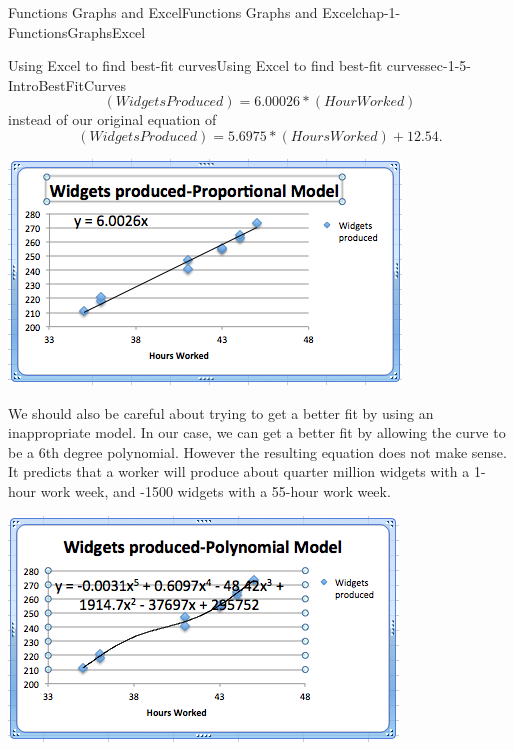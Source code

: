 \documentclass[oneside,10pt,]{book}
\numberwithin{equation}{section}
\begin{document}
\begin{chapterptx}{Functions Graphs and Excel}{}{Functions Graphs and Excel}{}{}{chap-1-FunctionsGraphsExcel}
\begin{sectionptx}{Using Excel to find best-fit curves}{}{Using Excel to find best-fit curves}{}{}{sec-1-5-IntroBestFitCurves}
\begin{equation*}
(Widgets Produced) = 6.00026*(Hour Worked)
\end{equation*}
instead of our original equation of%
\begin{equation*}
(Widgets Produced) = 5.6975*(Hours Worked)+12.54.
\end{equation*}
\begin{sidebyside}{1}{0.1}{0.1}{0}%
\begin{sbspanel}{0.8}%
\includegraphics[width=1\linewidth]{images/sec1-5-7.png}
\end{sbspanel}%
\end{sidebyside}%
%
\par
\hypertarget{p-387}{}%
We should also be careful about trying to get a better fit by using an inappropriate model.  In our case, we can get a better fit by allowing the curve to be a 6th degree polynomial.  However the resulting equation does not make sense.  It predicts that a worker will produce about quarter million widgets with a 1-hour work week, and -1500 widgets with a 55-hour work week. \leavevmode%
\begin{sidebyside}{1}{0.1}{0.1}{0}%
\begin{sbspanel}{0.8}%
\includegraphics[width=1\linewidth]{images/sec1-5-8.png}

\end{sbspanel}
\end{sidebyside}
\end{sectionptx}
\end{chapterptx}
\end{document}
